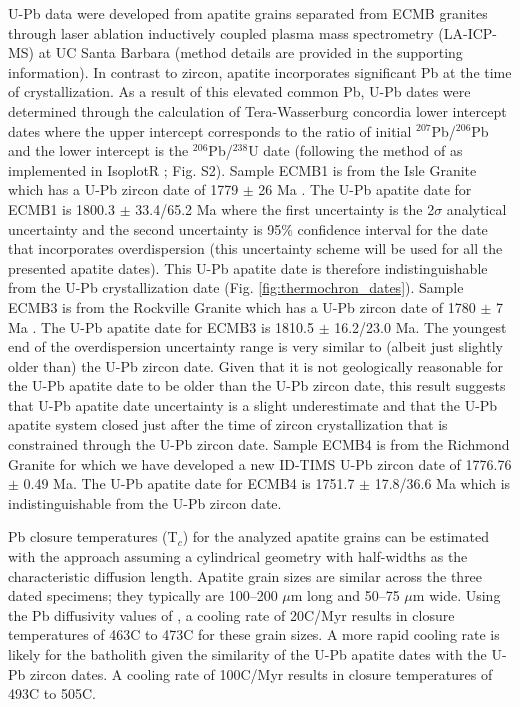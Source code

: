 \documentclass[draft]{agujournal2019}
\begin{document}
U-Pb data were developed from apatite grains separated from ECMB granites through laser ablation inductively coupled plasma mass spectrometry (LA-ICP-MS) at UC Santa Barbara (method details are provided in the supporting information). In contrast to zircon, apatite incorporates significant Pb at the time of crystallization. As a result of this elevated common Pb, U-Pb dates were determined through the calculation of Tera-Wasserburg concordia lower intercept dates where the upper intercept corresponds to the ratio of initial $^{207}$Pb/$^{206}$Pb and the lower intercept is the $^{206}$Pb/$^{238}$U date (following the method of  as implemented in IsoplotR ; Fig. S2). Sample ECMB1 is from the Isle Granite which has a U-Pb zircon date of 1779 $\pm$ 26 Ma \cite{Holm2005a}. The U-Pb apatite date for ECMB1 is 1800.3 $\pm$ 33.4/65.2 Ma where the first uncertainty is the 2$\sigma$ analytical uncertainty and the second uncertainty is 95$\%$ confidence interval for the date that incorporates overdispersion (this uncertainty scheme will be used for all the presented apatite dates). This U-Pb apatite date is therefore indistinguishable from the U-Pb crystallization date (Fig. \ref{fig:thermochron_dates}). Sample ECMB3 is from the Rockville Granite which has a U-Pb zircon date of 1780 $\pm$ 7 Ma \cite{Holm2005a}. The U-Pb apatite date for ECMB3 is 1810.5 $\pm$ 16.2/23.0 Ma. The youngest end of the overdispersion uncertainty range is very similar to (albeit just slightly older than) the U-Pb zircon date. Given that it is not geologically reasonable for the U-Pb apatite date to be older than the U-Pb zircon date, this result suggests that U-Pb apatite date uncertainty is a slight underestimate and that the U-Pb apatite system closed just after the time of zircon crystallization that is constrained through the U-Pb zircon date.  Sample ECMB4 is from the Richmond Granite for which we have developed a new ID-TIMS U-Pb zircon date of 1776.76 $\pm$ 0.49 Ma. The U-Pb apatite date for ECMB4 is 1751.7 $\pm$ 17.8/36.6 Ma which is indistinguishable from the U-Pb zircon date.

Pb closure temperatures (T$_c$) for the analyzed apatite grains can be estimated with the  approach assuming a cylindrical geometry with half-widths as the characteristic diffusion length. Apatite grain sizes are similar across the three dated specimens; they typically are 100–200 $\mu$m long and 50–75 $\mu$m wide. Using the Pb diffusivity values of , a cooling rate of 20\textdegree C/Myr results in closure temperatures of 463\textdegree C to 473\textdegree C for these grain sizes. A more rapid cooling rate is likely for the batholith given the similarity of the U-Pb apatite dates with the U-Pb zircon dates. A cooling rate of 100\textdegree C/Myr results in closure temperatures of 493\textdegree C to 505\textdegree C.
\end{document}
